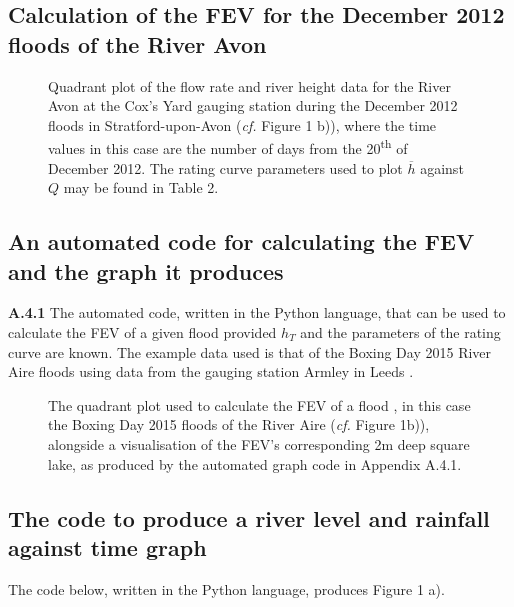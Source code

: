 \documentclass[11pt,a4paper]{article}
\begin{document}
\subsection{Calculation of the FEV for the December 2012 floods of the River Avon}
\begin{figure}[H]
\centering
{}
\caption{Quadrant plot of the flow rate and river height data for the River Avon at the Cox's Yard gauging station during the December 2012 floods in Stratford-upon-Avon (\textit{cf.} Figure 1 b)), where the time values in this case are the number of days from the 20\textsuperscript{th} of December 2012. The rating curve parameters used to plot $\overline{h}$ against $Q$ may be found in Table 2.}
\end{figure}

\subsection{An automated code for calculating the FEV and the graph it produces}
\small{\noindent \textbf{A.4.1} The automated code, written in the Python language, that can be used to calculate the FEV of a given flood provided $h_T$ and the parameters of the rating curve are known. The example data used is that of the Boxing Day 2015 River Aire floods using data from the gauging station Armley in Leeds \cite{Aire}.}
\begin{spacing}{1}\footnotesize{}
\end{spacing}

\vspace{19cm}
\begin{figure}[H]
\begin{center}
\caption{The quadrant plot used to calculate the FEV of a flood , in this case the Boxing Day 2015 floods of the River Aire (\textit{cf.} Figure 1b)), alongside a visualisation of the FEV's corresponding 2m deep square lake, as produced by the automated graph code in Appendix A.4.1.}
\end{center}
\end{figure}

\subsection{The code to produce a river level and rainfall against time graph}
\small{\noindent The code below, written in the Python language, produces Figure 1 a).}
\begin{spacing}{1}\footnotesize{}
\end{spacing}
\end{document}
